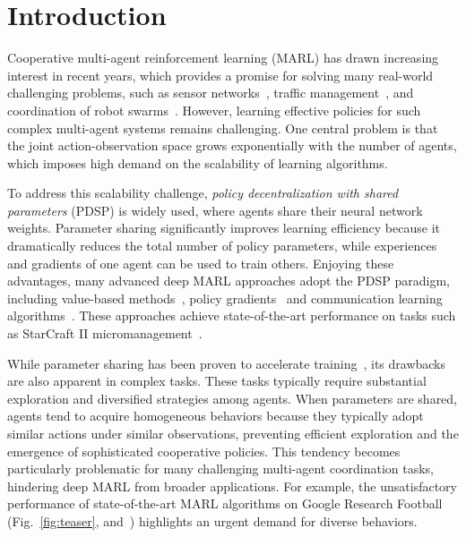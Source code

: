 \section{Introduction}

Cooperative multi-agent reinforcement learning (MARL) has drawn increasing interest in recent years, which provides a promise for solving many real-world challenging problems, such as sensor networks~\cite{zhang2011coordinated}, traffic management~\cite{singh2020hierarchical}, and coordination of robot swarms~\cite{huttenrauch2017guided}. However, learning effective policies for such complex multi-agent systems remains challenging. One central problem is that the joint action-observation space grows exponentially with the number of agents, which imposes high demand on the scalability of learning algorithms.

To address this scalability challenge, \emph{policy decentralization with shared parameters} (PDSP) is widely used, where agents share their neural network weights. Parameter sharing significantly improves learning efficiency because it dramatically reduces the total number of policy parameters, while experiences and gradients of one agent can be used to train others. Enjoying these advantages, many advanced deep MARL approaches adopt the PDSP paradigm, including value-based methods~\cite{sunehag2018value, rashid2018qmix, wang2020qplex,yang2021believe, iqbal2021randomized}, policy gradients~\cite{lowe2017multi, wang2021off, ma2021modeling, ndousse2021emergent, zhang2021fop} and communication learning algorithms~\cite{foerster2016learning, wang2020learning}. These approaches achieve state-of-the-art performance on tasks such as StarCraft II micromanagement~\cite{samvelyan2019starcraft}. 

While parameter sharing has been proven to accelerate training~\cite{wang2020roma}, its drawbacks are also apparent in complex tasks. These tasks typically require substantial exploration and diversified strategies among agents. When parameters are shared, agents tend to acquire homogeneous behaviors because they typically adopt similar actions under similar observations, preventing efficient exploration and the emergence of sophisticated cooperative policies. This tendency becomes particularly problematic for many challenging multi-agent coordination tasks, hindering deep MARL from broader applications. For example, the unsatisfactory performance of state-of-the-art MARL algorithms on Google Research Football (Fig.~\ref{fig:teaser}, and~\cite{kurach2020google}) highlights an urgent demand for diverse behaviors.

